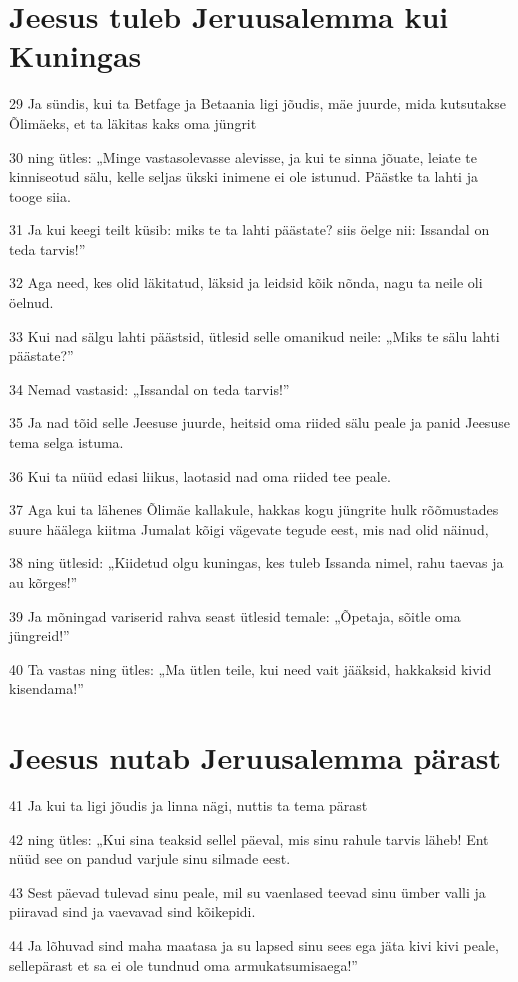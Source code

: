 \section*{Jeesus tuleb Jeruusalemma kui Kuningas}

\par 29 Ja sündis, kui ta Betfage ja Betaania ligi jõudis, mäe juurde, mida kutsutakse Õlimäeks, et ta läkitas kaks oma jüngrit
\par 30 ning ütles: „Minge vastasolevasse alevisse, ja kui te sinna jõuate, leiate te kinniseotud sälu, kelle seljas ükski inimene ei ole istunud. Päästke ta lahti ja tooge siia.
\par 31 Ja kui keegi teilt küsib: miks te ta lahti päästate? siis öelge nii: Issandal on teda tarvis!”
\par 32 Aga need, kes olid läkitatud, läksid ja leidsid kõik nõnda, nagu ta neile oli öelnud.
\par 33 Kui nad sälgu lahti päästsid, ütlesid selle omanikud neile: „Miks te sälu lahti päästate?”
\par 34 Nemad vastasid: „Issandal on teda tarvis!”
\par 35 Ja nad tõid selle Jeesuse juurde, heitsid oma riided sälu peale ja panid Jeesuse tema selga istuma.
\par 36 Kui ta nüüd edasi liikus, laotasid nad oma riided tee peale.
\par 37 Aga kui ta lähenes Õlimäe kallakule, hakkas kogu jüngrite hulk rõõmustades suure häälega kiitma Jumalat kõigi vägevate tegude eest, mis nad olid näinud,
\par 38 ning ütlesid: „Kiidetud olgu kuningas, kes tuleb Issanda nimel, rahu taevas ja au kõrges!”
\par 39 Ja mõningad variserid rahva seast ütlesid temale: „Õpetaja, sõitle oma jüngreid!”
\par 40 Ta vastas ning ütles: „Ma ütlen teile, kui need vait jääksid, hakkaksid kivid kisendama!”

\section*{Jeesus nutab Jeruusalemma pärast}

\par 41 Ja kui ta ligi jõudis ja linna nägi, nuttis ta tema pärast
\par 42 ning ütles: „Kui sina teaksid sellel päeval, mis sinu rahule tarvis läheb! Ent nüüd see on pandud varjule sinu silmade eest.
\par 43 Sest päevad tulevad sinu peale, mil su vaenlased teevad sinu ümber valli ja piiravad sind ja vaevavad sind kõikepidi.
\par 44 Ja lõhuvad sind maha maatasa ja su lapsed sinu sees ega jäta kivi kivi peale, sellepärast et sa ei ole tundnud oma armukatsumisaega!”

